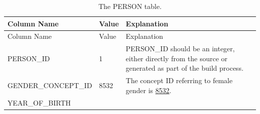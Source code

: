 \documentclass[]{book}
\begin{document}
\begin{longtable}[]{@{}lll@{}}
\caption{\label{tab:person} The PERSON table.}\tabularnewline
\toprule
\begin{minipage}[b]{0.33\columnwidth}\raggedright\strut
Column Name\strut
\end{minipage} & \begin{minipage}[b]{0.16\columnwidth}\raggedright\strut
Value\strut
\end{minipage} & \begin{minipage}[b]{0.42\columnwidth}\raggedright\strut
Explanation\strut
\end{minipage}\tabularnewline
\midrule
\endfirsthead
\toprule
\begin{minipage}[b]{0.33\columnwidth}\raggedright\strut
Column Name\strut
\end{minipage} & \begin{minipage}[b]{0.16\columnwidth}\raggedright\strut
Value\strut
\end{minipage} & \begin{minipage}[b]{0.42\columnwidth}\raggedright\strut
Explanation\strut
\end{minipage}\tabularnewline
\midrule
\endhead
\begin{minipage}[t]{0.33\columnwidth}\raggedright\strut
PERSON\_ID\strut
\end{minipage} & \begin{minipage}[t]{0.16\columnwidth}\raggedright\strut
1\strut
\end{minipage} & \begin{minipage}[t]{0.42\columnwidth}\raggedright\strut
PERSON\_ID should be an integer, either directly from the source or
generated as part of the build process.\strut
\end{minipage}\tabularnewline
\begin{minipage}[t]{0.33\columnwidth}\raggedright\strut
GENDER\_CONCEPT\_ID\strut
\end{minipage} & \begin{minipage}[t]{0.16\columnwidth}\raggedright\strut
8532\strut
\end{minipage} & \begin{minipage}[t]{0.42\columnwidth}\raggedright\strut
The concept ID referring to female gender is
\href{http://athena.ohdsi.org/search-terms/terms/8532}{8532}.\strut
\end{minipage}\tabularnewline
\begin{minipage}[t]{0.33\columnwidth}\raggedright\strut
YEAR\_OF\_BIRTH\strut
\end{minipage} & \begin{minipage}[t]{0.16\columnwidth}\raggedright\strut

\end{minipage}
\end{longtable}
\end{document}

